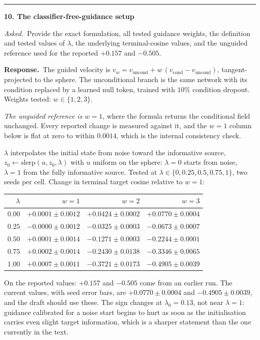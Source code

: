 \documentclass[11pt]{article}
\newenvironment{item12}[1]{%
  \par\medskip\noindent\rule{\textwidth}{0.7pt}\par\nobreak\smallskip
  \noindent\textbf{\large #1}\par\nobreak\smallskip
}{\par\medskip}
\newcommand{\ask}[1]{\noindent\emph{Asked.}\ #1\par\smallskip}
\newcommand{\resp}{\noindent\textbf{Response.}\ }
\begin{document}
\begin{item12}{10. The classifier-free-guidance setup}
\ask{Provide the exact formulation, all tested guidance weights, the definition and tested values
of $\lambda$, the underlying terminal-cosine values, and the unguided reference used for the
reported $+0.157$ and $-0.505$.}

\resp The guided velocity is
$v_w=v_{\mathrm{uncond}}+w\,(v_{\mathrm{cond}}-v_{\mathrm{uncond}})$, tangent-projected to the
sphere. The unconditional branch is the same network with its condition replaced by a learned
null token, trained with $10\%$ condition dropout. Weights tested: $w\in\{1,2,3\}$.

\emph{The unguided reference is $w=1$}, where the formula returns the conditional field
unchanged. Every reported change is measured against it, and the $w=1$ column below is flat at
zero to within $0.0014$, which is the internal consistency check.

$\lambda$ interpolates the initial state from noise toward the informative source,
$z_0\leftarrow\mathrm{slerp}(u,z_0,\lambda)$ with $u$ uniform on the sphere: $\lambda=0$ starts
from noise, $\lambda=1$ from the fully informative source. Tested at
$\lambda\in\{0,0.25,0.5,0.75,1\}$, two seeds per cell. Change in terminal target cosine relative
to $w=1$:

\begin{center}
\small
\begin{tabular}{@{}rrrr@{}}
\toprule
$\lambda$ & $w=1$ & $w=2$ & $w=3$\\
\midrule
$0.00$ & $+0.0001\pm0.0012$ & $+0.0424\pm0.0002$ & $+0.0770\pm0.0004$\\
$0.25$ & $-0.0000\pm0.0012$ & $-0.0325\pm0.0003$ & $-0.0673\pm0.0007$\\
$0.50$ & $+0.0001\pm0.0014$ & $-0.1271\pm0.0003$ & $-0.2244\pm0.0001$\\
$0.75$ & $+0.0002\pm0.0014$ & $-0.2430\pm0.0138$ & $-0.3346\pm0.0065$\\
$1.00$ & $+0.0007\pm0.0011$ & $-0.3721\pm0.0173$ & $-0.4905\pm0.0039$\\
\bottomrule
\end{tabular}
\end{center}

On the reported values: $+0.157$ and $-0.505$ come from an earlier run. The current values, with
seed error bars, are $+0.0770\pm0.0004$ and $-0.4905\pm0.0039$, and the draft should use these.
The sign changes at $\lambda_0=0.13$, not near $\lambda=1$: guidance calibrated for a noise start
begins to hurt as soon as the initialisation carries even slight target information, which is a
sharper statement than the one currently in the text.
\end{item12}
\end{document}
